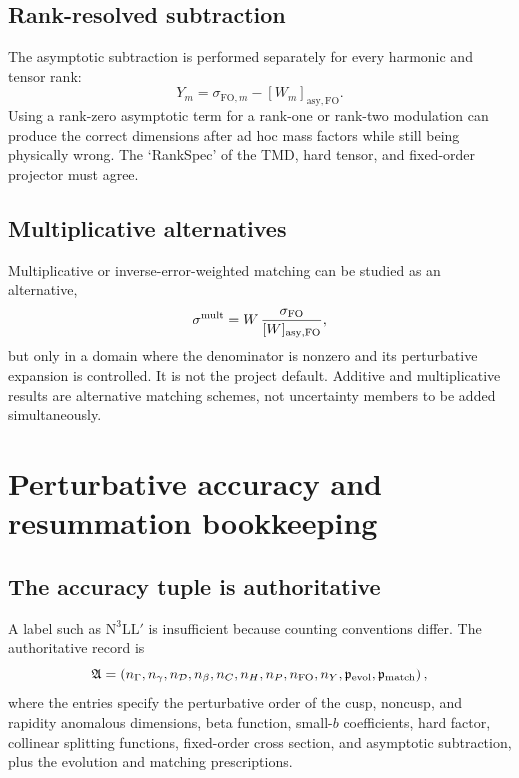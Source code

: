 \documentclass[11pt]{article}
\newcommand{\cD}{\mathcal D}
\newcommand{\FO}{\mathrm{FO}}
\newcommand{\asy}{\mathrm{asy}}
\begin{document}
\subsection{Rank-resolved subtraction}

The asymptotic subtraction is performed separately for every harmonic and
tensor rank:
\begin{equation}
 Y_m
 =\sigma_{\FO,m}-[W_m]_{\asy,\FO}.
 \label{eq:rank-resolved-y}
\end{equation}
Using a rank-zero asymptotic term for a rank-one or rank-two modulation can
produce the correct dimensions after ad hoc mass factors while still being
physically wrong.  The `RankSpec' of the TMD, hard tensor, and fixed-order
projector must agree.

\subsection{Multiplicative alternatives}

Multiplicative or inverse-error-weighted matching can be studied as an
alternative,
\begin{equation}
 \sigma^{\rm mult}
 =W\,\frac{\sigma_{\FO}}{[W]_{\asy,\FO}},
 \label{eq:multiplicative-matching}
\end{equation}
but only in a domain where the denominator is nonzero and its perturbative
expansion is controlled.  It is not the project default.  Additive and
multiplicative results are alternative matching schemes, not uncertainty
members to be added simultaneously.

\section{Perturbative accuracy and resummation bookkeeping}
\label{sec:accuracy}

\subsection{The accuracy tuple is authoritative}

A label such as \(\mathrm{N}^3\mathrm{LL}'\) is insufficient because counting
conventions differ.  The authoritative record is
\begin{equation}
 \mathfrak A=
 \left(
 n_{\Gamma},n_{\gamma},n_{\cD},n_{\beta},
 n_C,n_H,n_P,n_{\FO},n_Y,
 \mathfrak p_{\rm evol},\mathfrak p_{\rm match}
 \right),
 \label{eq:accuracy-tuple}
\end{equation}
where the entries specify the perturbative order of the cusp, noncusp, and
rapidity anomalous dimensions, beta function, small-\(b\) coefficients, hard
factor, collinear splitting functions, fixed-order cross section, and
asymptotic subtraction, plus the evolution and matching prescriptions.
\end{document}
